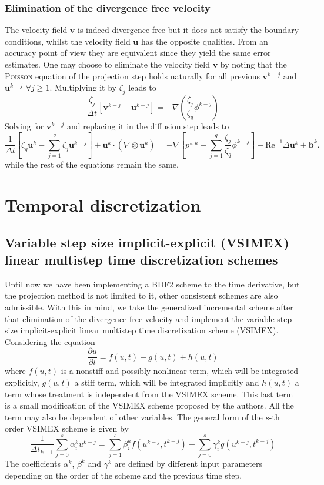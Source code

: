 \documentclass[]{scrartcl}
\newcommand{\pfrac}[2]{\frac{\partial #1}{\partial #2}}
\newcommand{\bs}[1]{\boldsymbol{#1}}
\begin{document}
\subsubsection{Elimination of the divergence free velocity}
The velocity field $\bs{v}$ is indeed divergence free but it does not satisfy the boundary conditions, whilst the velocity field $\bs{u}$ has the opposite qualities. From an accuracy point of view they are equivalent since they yield the same error estimates. One may choose to eliminate the velocity field $\bs{v}$ by noting that the \textsc{Poisson} equation of the projection step holds naturally for all previous $\bs{v}^{k-j}$ and $\bs{u}^{k-j}$ $\forall j\ge 1$. Multiplying it by $\zeta_j$ leads to
\begin{equation*}
	\dfrac{\zeta_j}{\Delta t} \left[\bs{v}^{k-j} - \bs{u}^{k-j} \right] = -\nabla \left(\dfrac{\zeta_j}{\zeta_q}\phi^{k-j}\right)
\end{equation*}
Solving for $\bs{v}^{k-j}$ and replacing it in the diffusion step leads to
\begin{equation*}
		\dfrac{1}{\Delta t} \left[\zeta_q \bs{u}^{k} - \sum_{j=1}^{q} \zeta_j \bs{u}^{k-j}\right]  + \bs{u}^{k} \cdot (\nabla \otimes \bs{u}^{k}) = -\nabla	\left[p^{\star, k} + \sum_{j=1}^{q} \dfrac{\zeta_j}{\zeta_q}\phi^{k-j} \right] +  \mathrm{Re}^{-1} \Delta \bs{u}^{k} + \bs{b}^{k}.
\end{equation*}
while the rest of the equations remain the same.
\section{Temporal discretization}
\subsection{Variable step size implicit-explicit (VSIMEX) linear multistep time discretization schemes }
Until now we have been implementing a BDF2 scheme to the time derivative, but the projection method is not limited to it, other consistent schemes are also admissible. With this in mind, we take the generalized incremental scheme after that elimination of the divergence free velocity and implement the variable step size implicit-explicit linear multistep time discretization scheme (VSIMEX). Considering the equation
\begin{equation*}
	\pfrac{u}{t} = f(u, t) + g(u, t) + h(u, t)
\end{equation*}
where $f(u, t)$ is a nonstiff and possibly nonlinear term, which will be integrated explicitly, $g(u,  t)$ a stiff term, which will be integrated implicitly and $h(u, t)$ a term whose treatment is independent from the VSIMEX scheme. This last term is a small modification of the VSIMEX scheme proposed by the authors. All the term may also be dependent of other variables. The general form of the $s$-th order VSIMEX scheme is given by
\begin{equation*}
	\dfrac{1}{\Delta t_{k-1}} \sum_{j=0}^{s} \alpha_i^k u^{k-j} = \sum_{j=1}^{s} \beta_i^k f(u^{k-j}, t^{k-j}) + \sum_{j=0}^{s} \gamma_i^k g(u^{k-j}, t^{k-j})
\end{equation*}
The coefficients $\alpha^k$, $\beta^k$ and $\gamma^k$ are defined by different input parameters depending on the order of the scheme and the previous time step.
\end{document}
